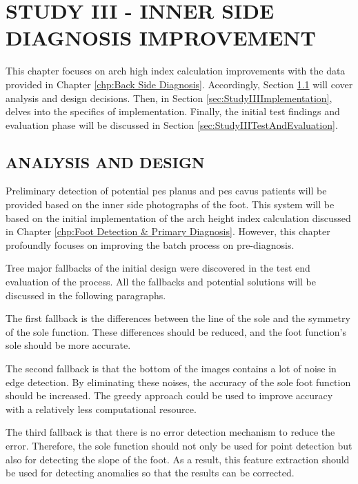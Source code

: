 \chapter{STUDY III - INNER SIDE DIAGNOSIS IMPROVEMENT }\label{chp:Inner Side Diagnosis Improvement}

This chapter focuses on arch high index calculation improvements with the data provided in Chapter \ref{chp:Back Side Diagnosis}. Accordingly, Section \ref{sec:StudyIIIAnalysisAndDesign} will cover analysis and design decisions. Then, in Section \ref{sec:StudyIIIImplementation}, delves into the specifics of implementation. Finally, the initial test findings and evaluation phase will be discussed in Section \ref{sec:StudyIIITestAndEvaluation}.

\section{ANALYSIS AND DESIGN}\label{sec:StudyIIIAnalysisAndDesign}

Preliminary detection of potential pes planus and pes cavus patients will be provided based on the inner side photographs of the foot. This system will be based on the initial implementation of the arch height index calculation discussed in Chapter \ref{chp:Foot Detection & Primary Diagnosis}. However, this chapter profoundly focuses on improving the batch process on pre-diagnosis.

Tree major fallbacks of the initial design were discovered in the test end evaluation of the process. All the fallbacks and potential solutions will be discussed in the following paragraphs.  

The first fallback is the differences between the line of the sole and the symmetry of the sole function. These differences should be reduced, and the foot function's sole should be more accurate.

The second fallback is that the bottom of the images contains a lot of noise in edge detection. By eliminating these noises, the accuracy of the sole foot function should be increased. The greedy approach could be used to improve accuracy with a relatively less computational resource.

The third fallback is that there is no error detection mechanism to reduce the error. Therefore, the sole function should not only be used for point detection but also for detecting the slope of the foot. As a result, this feature extraction should be used for detecting anomalies so that the results can be corrected.

